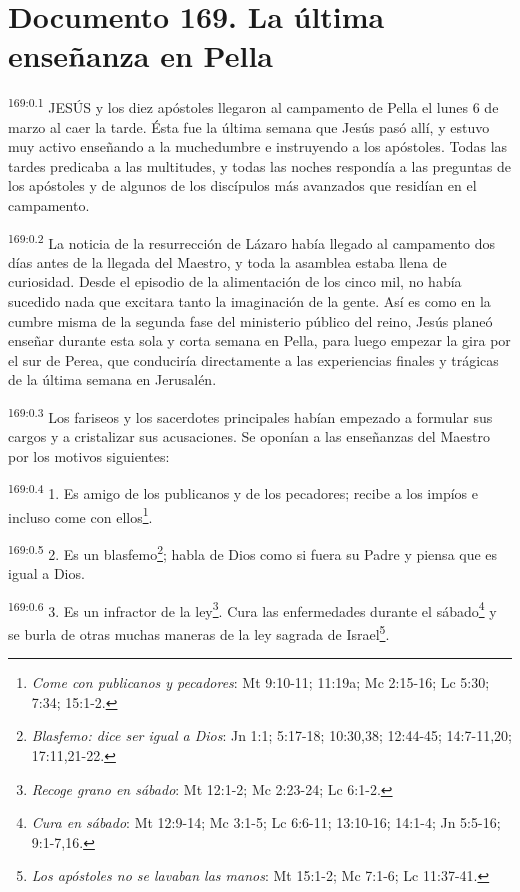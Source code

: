 \chapter{Documento 169. La última enseñanza en Pella}
\par
\textsuperscript{169:0.1} JESÚS y los diez apóstoles llegaron al campamento de Pella el lunes 6 de marzo al caer la tarde. Ésta fue la última semana que Jesús pasó allí, y estuvo muy activo enseñando a la muchedumbre e instruyendo a los apóstoles. Todas las tardes predicaba a las multitudes, y todas las noches respondía a las preguntas de los apóstoles y de algunos de los discípulos más avanzados que residían en el campamento.

\par
\textsuperscript{169:0.2} La noticia de la resurrección de Lázaro había llegado al campamento dos días antes de la llegada del Maestro, y toda la asamblea estaba llena de curiosidad. Desde el episodio de la alimentación de los cinco mil, no había sucedido nada que excitara tanto la imaginación de la gente. Así es como en la cumbre misma de la segunda fase del ministerio público del reino, Jesús planeó enseñar durante esta sola y corta semana en Pella, para luego empezar la gira por el sur de Perea, que conduciría directamente a las experiencias finales y trágicas de la última semana en Jerusalén.

\par
\textsuperscript{169:0.3} Los fariseos y los sacerdotes principales habían empezado a formular sus cargos y a cristalizar sus acusaciones. Se oponían a las enseñanzas del Maestro por los motivos siguientes:

\par
\textsuperscript{169:0.4} 1. Es amigo de los publicanos y de los pecadores; recibe a los impíos e incluso come con ellos\footnote{\textit{Come con publicanos y pecadores}: Mt 9:10-11; 11:19a; Mc 2:15-16; Lc 5:30; 7:34; 15:1-2.}.

\par
\textsuperscript{169:0.5} 2. Es un blasfemo\footnote{\textit{Blasfemo: dice ser igual a Dios}: Jn 1:1; 5:17-18; 10:30,38; 12:44-45; 14:7-11,20; 17:11,21-22.}; habla de Dios como si fuera su Padre y piensa que es igual a Dios.

\par
\textsuperscript{169:0.6} 3. Es un infractor de la ley\footnote{\textit{Recoge grano en sábado}: Mt 12:1-2; Mc 2:23-24; Lc 6:1-2.}. Cura las enfermedades durante el sábado\footnote{\textit{Cura en sábado}: Mt 12:9-14; Mc 3:1-5; Lc 6:6-11; 13:10-16; 14:1-4; Jn 5:5-16; 9:1-7,16.} y se burla de otras muchas maneras de la ley sagrada de Israel\footnote{\textit{Los apóstoles no se lavaban las manos}: Mt 15:1-2; Mc 7:1-6; Lc 11:37-41.}.

